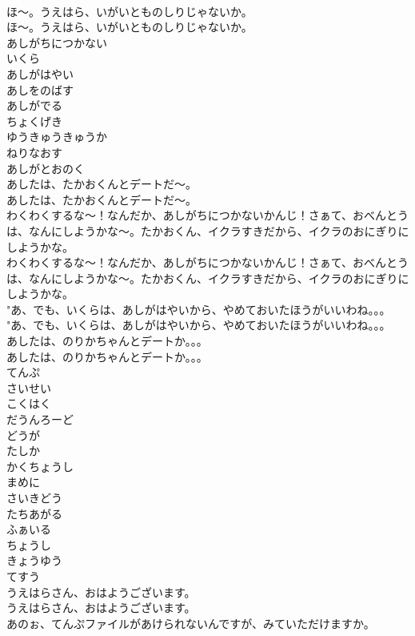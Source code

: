 \documentclass[8pt]{extreport}
\begin{document}
\begin{CJK}{UTF8}{min}
\\	ほ～。うえはら、いがいとものしりじゃないか。	
\\	ほ～。うえはら、いがいとものしりじゃないか。 
\\	あしがちにつかない
\\	いくら
\\	あしがはやい
\\	あしをのばす
\\	あしがでる
\\	ちょくげき
\\	ゆうきゅうきゅうか
\\	ねりなおす
\\	あしがとおのく
\\	あしたは、たかおくんとデートだ～。	
\\	あしたは、たかおくんとデートだ～。 
\\	わくわくするな～！なんだか、あしがちにつかないかんじ！さぁて、おべんとうは、なんにしようかな～。たかおくん、イクラすきだから、イクラのおにぎりにしようかな。	
\\	わくわくするな～！なんだか、あしがちにつかないかんじ！さぁて、おべんとうは、なんにしようかな～。たかおくん、イクラすきだから、イクラのおにぎりにしようかな。 
\\	"あ、でも、いくらは、あしがはやいから、やめておいたほうがいいわね。。。
\\	"あ、でも、いくらは、あしがはやいから、やめておいたほうがいいわね。。。
\\	あしたは、のりかちゃんとデートか。。。	
\\	あしたは、のりかちゃんとデートか。。。 
\\	てんぷ
\\	さいせい
\\	こくはく
\\	だうんろーど
\\	どうが
\\	たしか
\\	かくちょうし
\\	まめに
\\	さいきどう
\\	たちあがる
\\	ふぁいる
\\	ちょうし
\\	きょうゆう
\\	てすう
\\	うえはらさん、おはようございます。	
\\	うえはらさん、おはようございます。 
\\	あのぉ、てんぷファイルがあけられないんですが、みていただけますか。	

\end{CJK}
\end{document}
